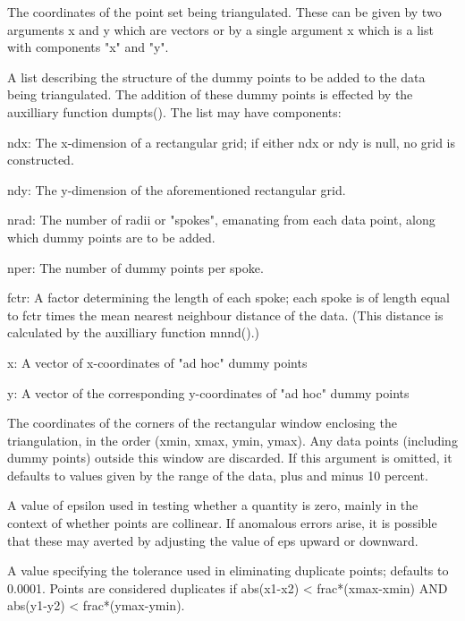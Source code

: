 \begin{Arguments}
\begin{ldescription}
\item[\code{x,y}] The coordinates of the point set being triangulated. These can be
given by two arguments x and y which are vectors or by a single
argument x which is a list with components "x" and "y".

\item[\code{dpl}] A list describing the structure of the dummy points to be added
to the data being triangulated.  The addition of these dummy points
is effected by the auxilliary function dumpts().  The list may have
components:


ndx: The x-dimension of a rectangular grid; if either ndx or ndy is null,
no grid is constructed.


ndy: The y-dimension of the aforementioned rectangular grid.


nrad: The number of radii or "spokes", emanating from each data point,
along which dummy points are to be added.


nper: The number of dummy points per spoke.


fctr: A factor determining the length of each spoke; each spoke is of
length equal to fctr times the mean nearest neighbour distance of the data.
(This distance is calculated by the auxilliary function mnnd().)


x: A vector of x-coordinates of "ad hoc" dummy points


y: A vector of the corresponding y-coordinates of "ad hoc" dummy points



\item[\code{rw}] The coordinates of the corners of the rectangular window enclosing
the triangulation, in the order (xmin, xmax, ymin, ymax).  Any data
points (including dummy points) outside this window are discarded.
If this argument is omitted, it defaults to values given by the range
of the data, plus and minus 10 percent.

\item[\code{eps}] A value of epsilon used in testing whether a quantity is zero, mainly
in the context of whether points are collinear.  If anomalous errors
arise, it is possible that these may averted by adjusting the value
of eps upward or downward.

\item[\code{frac}] A value specifying the tolerance used in eliminating duplicate
points; defaults to 0.0001. Points are considered duplicates if
abs(x1-x2) < frac*(xmax-xmin) AND abs(y1-y2) < frac*(ymax-ymin).


\end{ldescription}
\end{Arguments}
